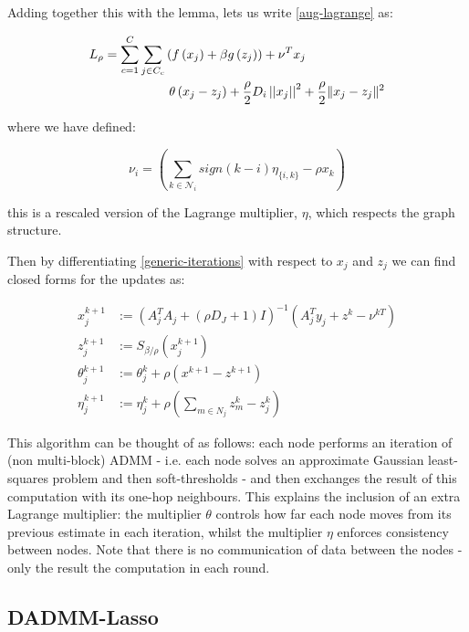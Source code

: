 Adding together this with the lemma, lets us write \eqref{aug-lagrange} as:

\begin{align}
L_\rho = \sum_{c=1}^C\sum_{j \in C_c} &\left( f\left(x_j\right) + \beta g\left(z_j\right)\right) + \nu^Tx_j \nonumber \\
& \text{        } \theta\left(x_j - z_j\right) + \frac{\rho}{2}D_i\left|\left|x_j\right|\right|^2 + \frac{\rho }{2}\|x_j-z_j\|^2
\label{generic-iterations}
\end{align}

where we have defined:

\begin{equation}
\nu_i = \left(\sum_{k \in \mathcal{N}_i} sign\left(k-i\right)\eta_{\{i,k\}} - \rho x_k \right)
\end{equation}

this is a rescaled version of the Lagrange multiplier, \(\eta\), which respects the graph structure. 

Then by differentiating \eqref{generic-iterations} with respect to \(x_j\) and \(z_j\) we  can find closed forms for the updates as:

\begin{thm}
\begin{align}
x_j^{k+1} &:= \left(A_j^TA_j + (\rho D_J + 1) I\right)^{-1}\left(A_j^Ty_j +  z^k - \nu^{kT}\right)\\
z_j^{k+1} &:= S_{\beta/\rho}\left(x_j^{k+1} \right)
 \\
\theta_j^{k+1} &:= \theta_j^{k} + \rho \left(x^{k+1}-z^{k+1}\right) \\
\eta_j^{k+1} &:= \eta_j^k + \rho\left(\sum_{m \in N_j} z_m^k - z_j^k\right)
\label{dadmm_algo_general}
\end{align}
\end{thm}

This algorithm can be thought of as follows: each node performs an iteration of (non multi-block) ADMM - i.e. each node solves an approximate Gaussian least-squares problem and then soft-thresholds - and then exchanges the result of this computation with its one-hop neighbours. This explains the inclusion of an extra Lagrange multiplier: the multiplier \(\theta\) controls how far each node moves from its previous estimate in each iteration, whilst the multiplier \(\eta\) enforces consistency between nodes. Note that there is no communication of data between the nodes - only the result the computation in each round.

\subsection{DADMM-Lasso}

